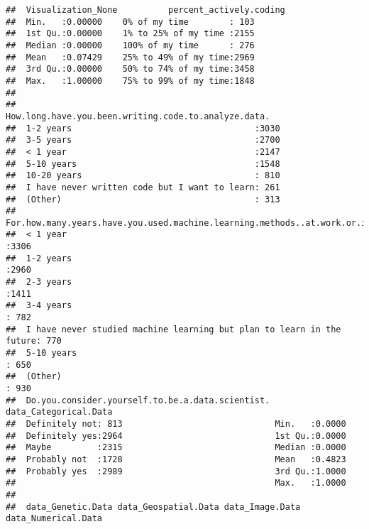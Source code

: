 \documentclass[
]{article}
\begin{document}
\begin{verbatim}
##  Visualization_None          percent_actively.coding
##  Min.   :0.00000    0% of my time        : 103      
##  1st Qu.:0.00000    1% to 25% of my time :2155      
##  Median :0.00000    100% of my time      : 276      
##  Mean   :0.07429    25% to 49% of my time:2969      
##  3rd Qu.:0.00000    50% to 74% of my time:3458      
##  Max.   :1.00000    75% to 99% of my time:1848      
##                                                     
##                     How.long.have.you.been.writing.code.to.analyze.data.
##  1-2 years                                    :3030                     
##  3-5 years                                    :2700                     
##  < 1 year                                     :2147                     
##  5-10 years                                   :1548                     
##  10-20 years                                  : 810                     
##  I have never written code but I want to learn: 261                     
##  (Other)                                      : 313                     
##                              For.how.many.years.have.you.used.machine.learning.methods..at.work.or.in.school..
##  < 1 year                                                             :3306                                   
##  1-2 years                                                            :2960                                   
##  2-3 years                                                            :1411                                   
##  3-4 years                                                            : 782                                   
##  I have never studied machine learning but plan to learn in the future: 770                                   
##  5-10 years                                                           : 650                                   
##  (Other)                                                              : 930                                   
##  Do.you.consider.yourself.to.be.a.data.scientist. data_Categorical.Data
##  Definitely not: 813                              Min.   :0.0000       
##  Definitely yes:2964                              1st Qu.:0.0000       
##  Maybe         :2315                              Median :0.0000       
##  Probably not  :1728                              Mean   :0.4823       
##  Probably yes  :2989                              3rd Qu.:1.0000       
##                                                   Max.   :1.0000       
##                                                                        
##  data_Genetic.Data data_Geospatial.Data data_Image.Data  data_Numerical.Data

\end{verbatim}
\end{document}
